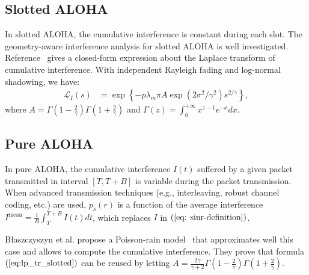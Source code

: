 \subsection{Slotted ALOHA}
\label{subsec: slotted-aloha}
In slotted ALOHA, the cumulative interference is constant during each slot. The geometry-aware interference analysis for slotted ALOHA is well investigated. Reference~\cite{haenggi2009interference} gives a closed-form expression about the Laplace transform of cumulative interference. With independent Rayleigh fading and log-normal shadowing, we have:
\begin{align}
\label{eq:lp_tr_slotted}
\mathcal{L}_{I}\left( s \right)  &=\exp \left\lbrace
-p\lambda_m \pi A  \exp \left( 2\sigma^2/\gamma^2\right) s^{2/\gamma}  
\right\rbrace,
\end{align}
where $A = \Gamma(1-\frac{2}{\gamma})\Gamma(1+\frac{2}{\gamma})$ and $\Gamma(z)=\int_{0}^{+\infty} x^{z-1} e^{-x} dx$. 
\subsection{Pure ALOHA}
\label{subsec: pure-aloha}
In pure ALOHA, the cumulative interference $I(t)$ suffered by a given packet transmitted in interval $\left[ T, T+B\right]$ is variable during the packet transmission. When advanced transmission techniques (e.g., interleaving, robust channel coding, etc.) are used, $p_{s}(r)$ is a function of the average interference $I^{\text{mean}} = \frac{1}{B}\int_{T}^{T+B} I(t)dt$, which replaces $I$ in $(\ref{eq: sinr-definition})$.

B{\l}aszczyszyn et al. propose a Poisson-rain model~\cite[Sec.2.4]{blaszczyszyn2015interference} that approximates well this case and allows to compute the cumulative interference. They prove that formula $(\ref{eq:lp_tr_slotted})$ can be reused by letting $A=\frac{2\gamma}{\gamma + 2} \Gamma(1-\frac{2}{\gamma})\Gamma(1+\frac{2}{\gamma})$.

